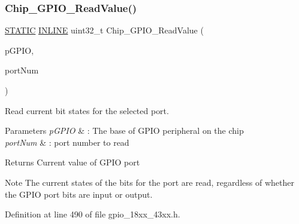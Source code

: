\subsubsection{\texorpdfstring{Chip\+\_\+\+G\+P\+I\+O\+\_\+\+Read\+Value()}{Chip\_GPIO\_ReadValue()}}
{\footnotesize\ttfamily \hyperlink{group___l_p_c___types___public___macros_ga10b2d890d871e1489bb02b7e70d9bdfb}{S\+T\+A\+T\+IC} \hyperlink{spifi__18xx__43xx_8h_a2eb6f9e0395b47b8d5e3eeae4fe0c116}{I\+N\+L\+I\+NE} uint32\+\_\+t Chip\+\_\+\+G\+P\+I\+O\+\_\+\+Read\+Value (\begin{DoxyParamCaption}\item[{\hyperlink{struct_l_p_c___g_p_i_o___t}{L\+P\+C\+\_\+\+G\+P\+I\+O\+\_\+T} $\ast$}]{p\+G\+P\+IO,  }\item[{uint8\+\_\+t}]{port\+Num }\end{DoxyParamCaption})}



Read current bit states for the selected port. 


\begin{DoxyParams}{Parameters}
{\em p\+G\+P\+IO} & \+: The base of G\+P\+IO peripheral on the chip \\
\hline
{\em port\+Num} & \+: port number to read \\
\hline
\end{DoxyParams}
\begin{DoxyReturn}{Returns}
Current value of G\+P\+IO port 
\end{DoxyReturn}
\begin{DoxyNote}{Note}
The current states of the bits for the port are read, regardless of whether the G\+P\+IO port bits are input or output. 
\end{DoxyNote}


Definition at line 490 of file gpio\+\_\+18xx\+\_\+43xx.\+h.

\mbox{\label{group___g_p_i_o__18_x_x__43_x_x_gacc2acb3d50b47954b25ef0ac439993d8}} 
